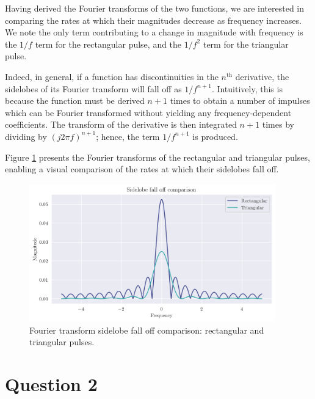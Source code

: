 \documentclass[a4paper, 11pt]{article}
\begin{document}
Having derived the Fourier transforms of the two functions, we are interested in
comparing the rates at which their magnitudes decrease as frequency increases.
We note the only term contributing to a change in magnitude with frequency is
the $1/f$ term for the rectangular pulse, and the $1/f^2$ term for the
triangular pulse.

Indeed, in general, if a function has discontinuities in the $n^\text{th}$
derivative, the sidelobes of its Fourier transform will fall off as $1/f^{n+1}$.
Intuitively, this is because the function must be derived $n+1$ times to obtain
a number of impulses which can be Fourier transformed without yielding any
frequency-dependent coefficients. The transform of the derivative is then
integrated $n+1$ times by dividing by $(j2\pi f)^{n+1}$; hence, the term
$1/f^{n+1}$ is produced.

\newpage

Figure \ref{fig:q1_sidelobes} presents the Fourier transforms of the rectangular
and triangular pulses, enabling a visual comparison of the rates at which their
sidelobes fall off.

\begin{figure}[ht]
    \centering
    \includegraphics[width=0.95\textwidth]{images/q1_sidelobes.png}
    \caption{Fourier transform sidelobe fall off comparison: rectangular and
             triangular pulses.}
    \label{fig:q1_sidelobes}
\end{figure}

\newpage
\section*{Question 2}
\end{document}
